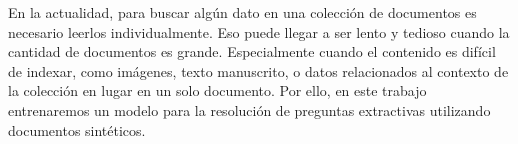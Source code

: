 \documentclass[../main.tex]{subfiles}
\begin{document}

%
%
%



En la actualidad, para buscar algún dato en una colección de documentos es necesario leerlos individualmente.
Eso puede llegar a ser lento y tedioso cuando la cantidad de documentos es grande.
Especialmente cuando el contenido es difícil de indexar,
como imágenes,
texto manuscrito,
o datos relacionados al contexto de la colección en lugar en un solo documento.
Por ello, en este trabajo entrenaremos un modelo para la resolución de preguntas extractivas utilizando documentos sintéticos.
\end{document}
